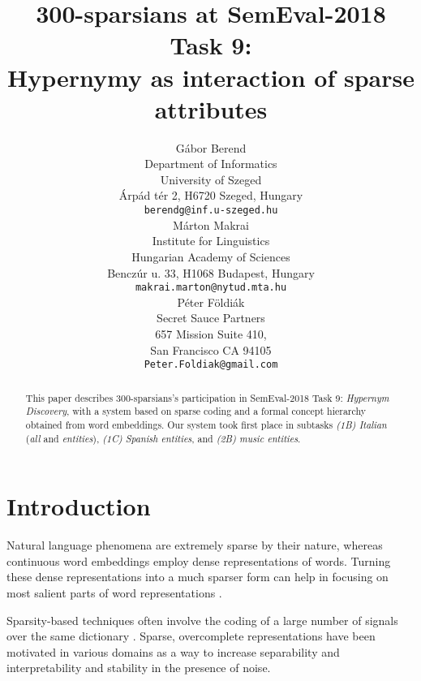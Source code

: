 \documentclass[11pt,a4paper]{article}
\title{300-sparsians at SemEval-2018 Task 9: \\
Hypernymy as interaction of sparse attributes}
\author{Gábor Berend \\
Department of Informatics \\ University of Szeged \\
Árpád tér 2, H6720 Szeged, Hungary \\
{\tt berendg@inf.u-szeged.hu} \\\And
  Márton Makrai  \\
  Institute for Linguistics \\
  Hungarian Academy of Sciences \\
  Benczúr u. 33, H1068 Budapest, Hungary \\
  {\tt makrai.marton@nytud.mta.hu} \\\AND
  Péter Földiák \\
  Secret Sauce Partners \\
  657 Mission Suite 410, \\
  San Francisco CA 94105 \\
  {\tt Peter.Foldiak@gmail.com} \\}
\date{}
\begin{document}
\maketitle

\begin{abstract}
  This paper describes 300-sparsians’s participation in SemEval-2018 Task 9:
  \emph{Hypernym Discovery}, with a system based on sparse coding and a formal
  concept hierarchy obtained from word embeddings.
  Our system took first place in subtasks
  \emph{(1B) Italian} (\emph{all} and \emph{entities}),
  \emph{(1C) Spanish entities}, and
  \emph{(2B) music entities}.
\end{abstract}


\section{Introduction}

Natural language phenomena are extremely sparse by their nature,
whereas continuous word embeddings employ dense representations of words.
Turning these dense representations into a much sparser form can help in
focusing on most salient parts of word representations
\citep{Faruqui:2015,Berend:2017,Subramanian:2018}.


Sparsity-based techniques often involve the coding of a large number of signals
over the same dictionary \citep{Rubinstein:2008}. Sparse, overcomplete
representations have been motivated in various domains as a way to increase
separability and interpretability \citep{Olshausen:1997} and
stability in the presence of noise.
\end{document}
